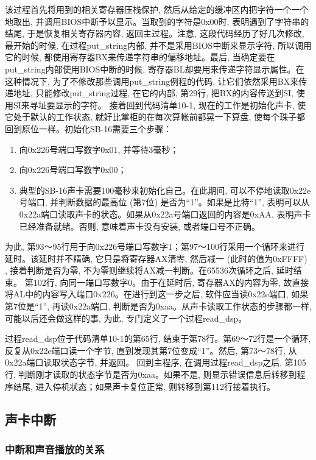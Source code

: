\documentclass[12pt]{article}
\begin{document}
\begin{CJK}{UTF8}{gbsn}
该过程首先将用到的相关寄存器压栈保护, 然后从给定的缓冲区内把字符一个一个地取出, 并调用BIOS中断予以显示。当取到的字符是0x00时, 表明遇到了字符串的结尾, 于是恢复相关寄存器内容, 返回主过程。注意, 这段代码经历了好几次修改, 最开始的时候, 在过程put\_{}string内部, 并不是采用BIOS中断来显示字符, 所以调用它的时候, 都使用寄存器BX来传递字符串的偏移地址。最后, 当确定要在put\_{}string内部使用BIOS中断的时候, 寄存器BL却要用来传递字符显示属性。在这种情况下, 为了不修改那些调用put\_{}string例程的代码, 让它们依然采用BX来传递地址, 只能修改put\_{}string过程, 在它的内部, 第29行, 把BX的内容传送到SI, 使用SI来寻址要显示的字符。
接着回到代码清单10-1, 现在的工作是初始化声卡, 使它处于默认的工作状态, 就好比掌柜的在每次算帐前都晃一下算盘, 使每个珠子都回到原位一样。初始化SB-16需要三个步骤：
\begin{enumerate}
\item 向0x226号端口写数字0x01, 并等待3毫秒；
\item 向0x226号端口写数字0x00；
\item 典型的SB-16声卡需要100毫秒来初始化自己。在此期间, 可以不停地读取0x22e号端口, 并判断数据的最高位 (第7位) 是否为“1”。如果是比特“1”, 表明可以从0x22a端口读取声卡的状态。如果从0x22a号端口返回的内容是0xAA, 表明声卡已经准备就绪。否则, 意味着声卡没有安装, 或者端口号不正确。
\end{enumerate}
为此, 第93～95行用于向0x226号端口写数字1；第97～100行采用一个循环来进行延时。该延时并不精确, 它只是将寄存器AX清零, 然后减一 (此时的值为0xFFFF) , 接着判断是否为零, 不为零则继续将AX减一判断。在65536次循环之后, 延时结束。
第102行, 向同一端口写数字0。由于在延时后, 寄存器AX的内容为零, 故直接将AL中的内容写入端口0x226。在进行到这一步之后, 软件应当读0x22e端口, 如果第7位是“1”, 再读0x22a端口, 判断是否为0xaa。从声卡读取工作状态的步骤都一样, 可能以后还会做这样的事, 为此, 专门定义了一个过程read\_{}dsp。

过程read\_{}dsp位于代码清单10-1的第65行, 结束于第78行。第69～72行是一个循环, 反复从0x22e端口读一个字节, 直到发现其第7位变成“1”。然后, 第73～78行, 从0x22a端口读取状态字节, 并返回。
回到主程序, 在调用过程read\_{}dsp之后, 第105行, 判断刚才读取的状态字节是否为0xaa。如果不是, 则显示错误信息后转移到程序结尾, 进入停机状态；如果声卡复位正常, 则转移到第112行接着执行。

\subsection{声卡中断}
\subsubsection{中断和声音播放的关系}


\end{CJK}
\end{document}

